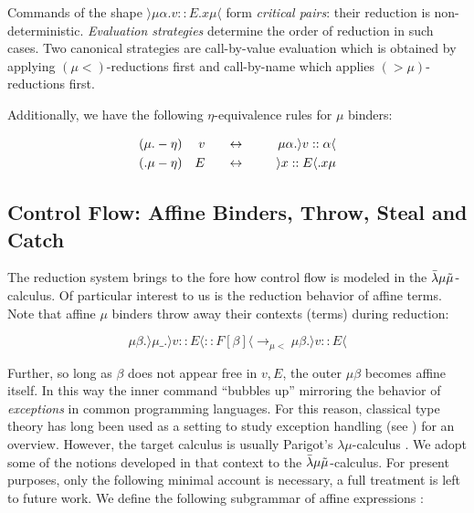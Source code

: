 \documentclass{IOS-Book-Article}
\begin{document}
Commands of the shape $\rangle \mu\alpha.v::E.x\mu \langle$ form \emph{critical pairs}: their reduction is non-deterministic. \emph{Evaluation strategies} determine the order of reduction in such cases. Two canonical strategies are call-by-value evaluation which is obtained by applying $(\mu<)$-reductions first and call-by-name which applies $(>\mu)$-reductions first.

Additionally, we have the following $\eta$-equivalence rules for $\mu$ binders:

\begin{align*}
  (\mu.-\eta&) & v &\mathrel{\mkern30mu\leftrightarrow\mkern30mu} & \mu \alpha.\rangle v :: \alpha \langle \\
  (.\mu-\eta&) & E &\mathrel{\mkern30mu\leftrightarrow\mkern30mu} & \rangle x :: E \langle .x\mu
\end{align*}

\subsection{Control Flow: Affine Binders, Throw,  Steal and Catch}\label{sec:control-flow:-affine}

The reduction system brings to the fore how control flow is modeled in the $\bar{\lambda}\mu\tilde{\mu}$-calculus.
Of particular interest to us is the reduction behavior of affine terms. Note that affine $\mu$ binders throw away their contexts (terms) during reduction:

\[\mu \beta.\rangle \mu\_.\rangle v :: E \langle :: F[\beta] \langle \longrightarrow_{\mu <} \mu \beta.\rangle v :: E \langle\]

Further, so long as $\beta$ does not appear free in $v,E$, the outer $\mu \beta$ becomes affine itself. In this way the inner command ``bubbles up'' mirroring the behavior of \emph{exceptions} in common programming languages.
For this reason, classical type theory has long been used as a setting to study exception handling (see \cite{vanBakel2019ExceptionHandling}) for an overview.
However, the target calculus is usually Parigot's $\lambda\mu$-calculus .
We adopt some of the notions developed in that context to the $\bar{\lambda}\mu\tilde{\mu}$-calculus.
For present purposes, only the following minimal account is necessary, a full treatment is left to future work.
We define the following subgrammar of affine expressions :

\begin{grammar}
\end{grammar}
\end{document}
